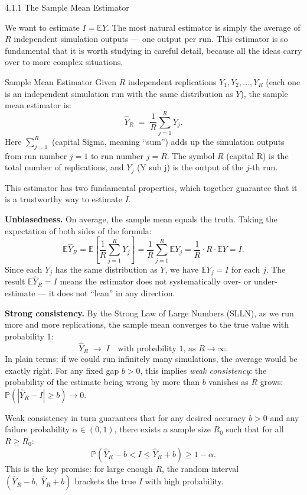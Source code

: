 \documentclass[aspectratio=169,10pt]{beamer}
\begin{document}
\begin{frame}[allowframebreaks]{4.1.1 The Sample Mean Estimator}

We want to estimate $I = \mathbb{E}Y$.  The most natural estimator is
simply the average of $R$ independent simulation outputs --- one output
per run.  This estimator is so fundamental that it is worth studying in
careful detail, because all the ideas carry over to more complex
situations.

\begin{block}{Sample Mean Estimator}
  Given $R$ independent replications $Y_1, Y_2, \ldots, Y_R$ (each one
  is an independent simulation run with the same distribution as $Y$),
  the sample mean estimator is:
  \[
    \hat{Y}_R \;=\; \frac{1}{R} \sum_{j=1}^{R} Y_j.
  \]
  Here $\sum_{j=1}^{R}$ (capital Sigma, meaning ``sum'') adds up the
  simulation outputs from run number $j=1$ to run number $j=R$.
  The symbol $R$ (capital R) is the total number of replications, and
  $Y_j$ (Y sub j) is the output of the $j$-th run.
\end{block}

This estimator has two fundamental properties, which together guarantee
that it is a trustworthy way to estimate $I$.

\textbf{Unbiasedness.}  On average, the sample mean equals the truth.
Taking the expectation of both sides of the formula:
\[
  \mathbb{E}\hat{Y}_R
    = \mathbb{E}\!\left[\frac{1}{R}\sum_{j=1}^R Y_j\right]
    = \frac{1}{R}\sum_{j=1}^R \mathbb{E}Y_j
    = \frac{1}{R} \cdot R \cdot \mathbb{E}Y
    = I.
\]
Since each $Y_j$ has the same distribution as $Y$, we have
$\mathbb{E}Y_j = I$ for each $j$.  The result $\mathbb{E}\hat{Y}_R = I$
means the estimator does not systematically over- or under-estimate ---
it does not ``lean'' in any direction.

\textbf{Strong consistency.}  By the Strong Law of Large Numbers (SLLN),
as we run more and more replications, the sample mean converges to the
true value with probability 1:
\[
  \hat{Y}_R \;\longrightarrow\; I \quad \text{with probability 1, as } R \to \infty.
\]
In plain terms: if we could run infinitely many simulations, the average
would be exactly right.  For any fixed gap $b > 0$, this implies
\emph{weak consistency}: the probability of the estimate being wrong by
more than $b$ vanishes as $R$ grows:
$\mathbb{P}(|\hat{Y}_R - I| \geq b) \to 0$.

Weak consistency in turn guarantees that for any desired accuracy $b > 0$
and any failure probability $\alpha \in (0,1)$, there exists a sample
size $R_0$ such that for all $R \geq R_0$:
\[
  \mathbb{P}\!\left(\hat{Y}_R - b < I \leq \hat{Y}_R + b\right) \geq 1 - \alpha.
  \tag{1.2}
\]
This is the key promise: for large enough $R$, the random interval
$(\hat{Y}_R - b,\; \hat{Y}_R + b)$ brackets the true $I$ with high
probability.


\end{frame}
\end{document}
